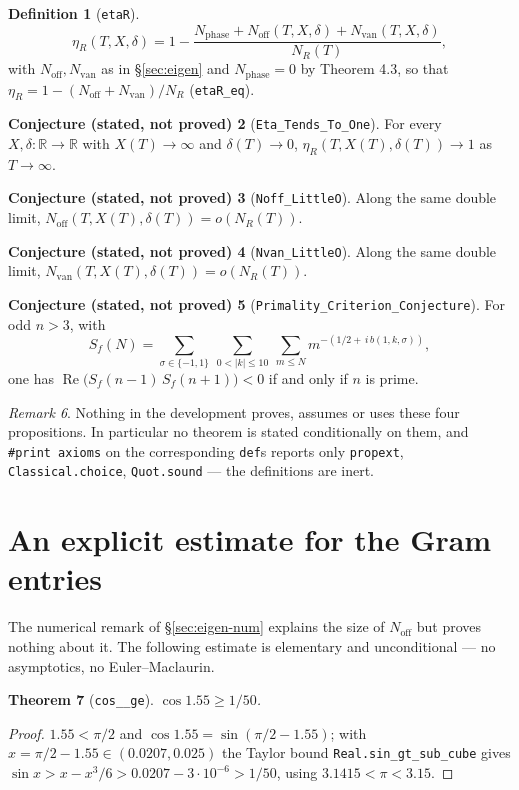 \documentclass[11pt,a4paper]{article}
\newcommand{\R}{\mathbb{R}}
\newcommand{\lb}{\_\allowbreak}
\newcommand{\code}[1]{\texttt{#1}}
\newtheorem{theorem}{Theorem}[section]
\theoremstyle{definition}
\newtheorem{definition}[theorem]{Definition}
\newtheorem{conjecture}[theorem]{Conjecture (stated, not proved)}
\theoremstyle{remark}
\newtheorem{remark}[theorem]{Remark}
\begin{document}
\begin{definition}[\code{etaR}]
\[
  \eta_R(T,X,\delta)=1-\frac{N_{\mathrm{phase}}+N_{\mathrm{off}}(T,X,\delta)
  +N_{\mathrm{van}}(T,X,\delta)}{N_R(T)},
\]
with $N_{\mathrm{off}},N_{\mathrm{van}}$ as in \S\ref{sec:eigen} and $N_{\mathrm{phase}}=0$
by Theorem 4.3, so that $\eta_R=1-(N_{\mathrm{off}}+N_{\mathrm{van}})/N_R$
(\code{etaR\lb eq}).
\end{definition}

\begin{conjecture}[\code{Eta\lb Tends\lb To\lb One}]
For every $X,\delta:\R\to\R$ with $X(T)\to\infty$ and $\delta(T)\to0$,
$\eta_R(T,X(T),\delta(T))\to1$ as $T\to\infty$.
\end{conjecture}
\begin{conjecture}[\code{Noff\lb LittleO}]
Along the same double limit, $N_{\mathrm{off}}(T,X(T),\delta(T))=o(N_R(T))$.
\end{conjecture}
\begin{conjecture}[\code{Nvan\lb LittleO}]
Along the same double limit, $N_{\mathrm{van}}(T,X(T),\delta(T))=o(N_R(T))$.
\end{conjecture}
\begin{conjecture}[\code{Primality\lb Criterion\lb Conjecture}]
For odd $n>3$, with
\[
  S_f(N)=\sum_{\sigma\in\{-1,1\}}\ \sum_{0<|k|\le10}\ \sum_{m\le N}
  m^{-(1/2+\,i\,b(1,k,\sigma))},
\]
one has $\operatorname{Re}\bigl(S_f(n-1)\,S_f(n+1)\bigr)<0$ if and only if $n$ is prime.
\end{conjecture}

\begin{remark}
Nothing in the development proves, assumes or uses these four propositions.  In
particular no theorem is stated conditionally on them, and \code{\#print axioms} on the
corresponding \code{def}s reports only \code{propext}, \code{Classical.choice},
\code{Quot.sound} --- the definitions are inert.
\end{remark}


\section{An explicit estimate for the Gram entries}\label{sec:estimate}

The numerical remark of \S\ref{sec:eigen-num} explains the size of $N_{\mathrm{off}}$ but proves
nothing about it.  The following estimate is elementary and unconditional --- no asymptotics, no
Euler--Maclaurin.

\begin{theorem}[\code{cos\lb 155\lb ge}]
$\cos 1.55 \ge 1/50$.
\end{theorem}
\begin{proof}
$1.55 < \pi/2$ and $\cos 1.55 = \sin(\pi/2-1.55)$; with
$x = \pi/2 - 1.55 \in (0.0207, 0.025)$ the Taylor bound
\code{Real.sin\lb gt\lb sub\lb cube} gives $\sin x > x - x^3/6 > 0.0207 - 3\cdot10^{-6} > 1/50$,
using $3.1415 < \pi < 3.15$.
\end{proof}
\end{document}
